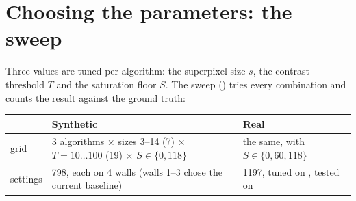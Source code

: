 \documentclass[10pt,a4paper]{article}
\begin{document}
\section{Choosing the parameters: the sweep}
\label{sec:params}
Three values are tuned per algorithm: the superpixel size $s$, the contrast threshold $T$ and the saturation floor
$S$. The sweep () tries every combination and counts the result against the ground truth:

\begin{center}\small
\begin{tabular}{lL{6.4cm}L{6.6cm}}
\toprule
 & Synthetic & Real\\
\midrule
grid & 3 algorithms $\times$ sizes 3--14 (7) $\times$ $T=10\ldots100$ (19) $\times$ $S\in\{0,118\}$ & the same, with
 $S\in\{0,60,118\}$\\
settings & 798, each on 4 walls (walls 1--3 chose the current baseline) & 1197, tuned on , tested on \\
\bottomrule
\end{tabular}
\end{center}
\end{document}
